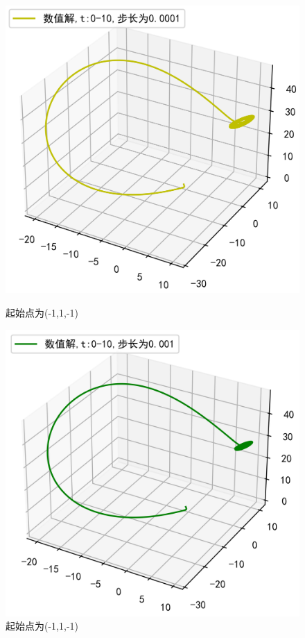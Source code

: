 \documentclass[a4paper]{article}%
\begin{document}
\begin{figure}[h]
    \begin{minipage}{0.48\linewidth}
    \centering
    \includegraphics[scale=0.65]{61}
    \caption{起始点为(-1,1,-1)}
    \end{minipage}
    \begin{minipage}{0.48\linewidth}
    \centering
    \includegraphics[scale=0.65]{62}
    \caption{起始点为(-1,1,-1)}
    \end{minipage}
\end{figure}
\end{document}
